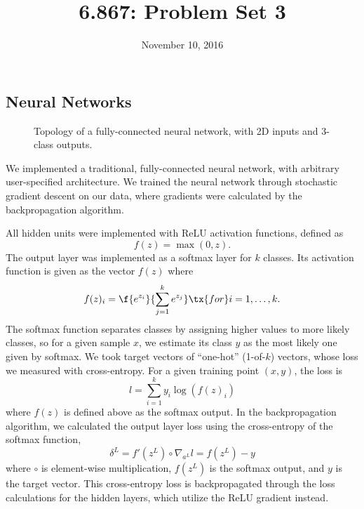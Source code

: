 \documentclass{article}
\title{6.867: Problem Set 3}
\date{November 10, 2016}
\begin{document}
\maketitle

\begin{multicols}{2}


\section{Neural Networks}
\label{sec:nn}

\def\layersep{2.5cm}

\begin{figure}[t]
    \label{fig:samplenn}
    \centering
    
    \caption{Topology of a fully-connected neural network, with 2D inputs and 3-class outputs.}
\end{figure}

We implemented a traditional, fully-connected neural network,
with arbitrary user-specified architecture.
We trained the neural network
through stochastic gradient descent on our data,
where gradients were calculated by the
backpropagation algorithm.

All hidden units were implemented with ReLU activation functions,
defined as
\begin{equation}
    f(z) = \max(0, z).
\end{equation}
The output layer was implemented as a softmax layer for $k$ classes.
Its activation function is given as the vector $f(z)$ where
\begin{equation}
    f(z)_i = \f{e^{z_i}}{\sum_{j=1}^{k}{e^{z_j}}} \tx{ for } i = 1,\dots,k.
\end{equation}
The softmax function separates classes
by assigning higher values to more likely classes,
so for a given sample $x$, we estimate its class $y$ as the most likely one
given by softmax.
We took target vectors of ``one-hot'' (1-of-$k$) vectors,
whose loss we measured with cross-entropy.
For a given training point $(x,y)$, the loss is
\begin{equation}
    l = \sum_{i = 1}^k{y_i \log(f(z)_i)}
\end{equation}
where $f(z)$ is defined above as the softmax output.
In the backpropagation algorithm,
we calculated the output layer loss using
the cross-entropy of the softmax function,
\begin{equation}
    \delta^L = f'(z^L)\circ\nabla_{a^L}l = f(z^L) - y
\end{equation}
where $\circ$ is element-wise multiplication, $f(z^L)$ is the softmax output,
and $y$ is the target vector.
This cross-entropy loss is backpropagated through the
loss calculations for the hidden layers,
which utilize the ReLU gradient instead.


\end{multicols}
\end{document}
